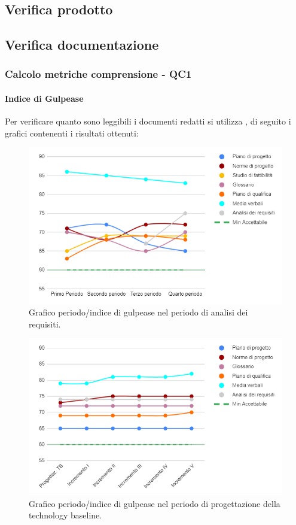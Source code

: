 \subsection{Verifica prodotto}


\subsection{Verifica documentazione}

\subsubsection{Calcolo metriche comprensione - QC1}

\paragraph{Indice di Gulpease}
Per verificare quanto sono leggibili i documenti redatti si utilizza , di seguito i grafici contenenti i risultati ottenuti:

\begin{figure}[H]
	\centering
	\includegraphics[width=0.8\linewidth]{./res/images/gulpease_1.png}
	\caption{Grafico periodo/indice di gulpease nel periodo di analisi dei requisiti.}
	\label{fig:Grafico indice di gulpease periodo di analisi dei requisiti.}
\end{figure}

\begin{figure}[H]
	\centering
	\includegraphics[width=0.8\linewidth]{./res/images/gulpease_2.png}
	\caption{Grafico periodo/indice di gulpease nel periodo di progettazione della technology baseline.}
	\label{fig:Grafico indice di gulpease periodo di progettazione della technology baseline.}
\end{figure}


